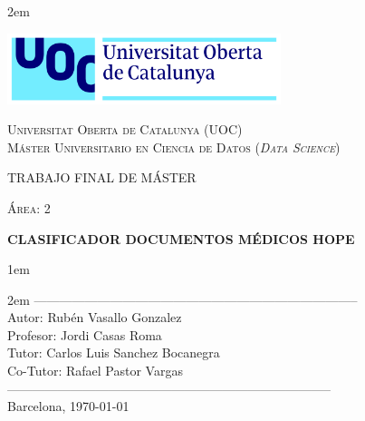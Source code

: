 \newpage
\thispagestyle{empty}

\baselineskip 2em


\centerline{\includegraphics[width=0.6\textwidth]{images/UOC-logo}}
\begin{center}
\textsc{Universitat Oberta de Catalunya (UOC) \\
 Máster Universitario en Ciencia de Datos (\textit{Data Science})\\}


\vspace*{1.5cm}

\textsc{\Large TRABAJO FINAL DE MÁSTER}

\vspace*{0.5cm}

\textsc{\large Área: 2}



\vspace*{2.0cm}

\textbf{\Large CLASIFICADOR DOCUMENTOS MÉDICOS HOPE }

\vspace{2.5cm}
\baselineskip 1em

\baselineskip 2em
-----------------------------------------------------------------------------\\
Autor:      Rubén Vasallo Gonzalez \\
Profesor:   Jordi Casas Roma\\
Tutor:      Carlos Luis Sanchez Bocanegra\\
Co-Tutor:   Rafael Pastor Vargas\\
-----------------------------------------------------------------------------\\
\vspace*{1.5cm}
Barcelona, \today

\end{center}

\newpage
\pagestyle{empty}
\hfill
